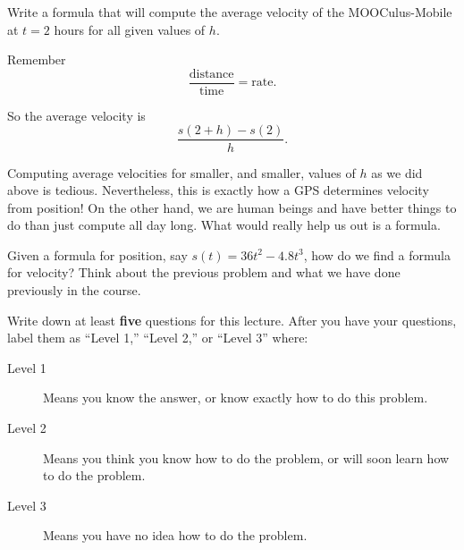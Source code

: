 \documentclass{ximera}
\begin{document}
\begin{problem}
  Write a formula that will compute the average velocity of the
  MOOCulus-Mobile at $t=2$ hours for all given values of $h$.
\begin{hint}
Remember
\[
\frac{\text{distance}}{\text{time}} = \text{rate}.
\]
\end{hint}
\begin{hint}
So the average velocity is
\[
\frac{s(2+h)-s(2)}{h}.
\]
\end{hint}
\end{problem}

Computing average velocities for smaller, and smaller, values of $h$ as
we did above is tedious. Nevertheless, this is exactly how a GPS
determines velocity from position! On the other hand, we are human
beings and have better things to do than just compute all day
long. What would really help us out is a formula.

\begin{problem}
  Given a formula for position, say $s(t) = 36t^2 -4.8t^3$, how do we
  find a formula for velocity?  Think about the previous problem and
  what we have done previously in the course.
  \begin{freeResponse}
  \end{freeResponse} 
\end{problem}

\begin{xarmaBoost}
  Write down at least \textbf{five} questions for this lecture. After
you have your questions, label them as ``Level 1,'' ``Level 2,'' or ``Level 3'' where:
\begin{description}
\item[Level 1] Means you know the answer, or know exactly how to do
  this problem.
\item[Level 2] Means you think you know how to do the problem, or will
  soon learn how to do the problem.
\item[Level 3] Means you have no idea how to do the problem.
\end{description}
\begin{freeResponse}
\end{freeResponse}
\end{xarmaBoost}
\end{document}
